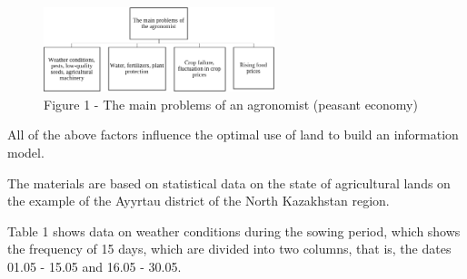 \begin{figure}[H]
	\centering
	\includegraphics[width=0.6\textwidth]{assets/1002}
	\caption*{Figure 1 - The main problems of an agronomist (peasant economy)}
\end{figure}

\begin{multicols}{2}
All of the above factors influence the optimal use of land to build an
information model.

The materials are based on statistical data on the state of agricultural
lands on the example of the Ayyrtau district of the North Kazakhstan
region.

Table 1 shows data on weather conditions during the sowing period, which
shows the frequency of 15 days, which are divided into two columns, that
is, the dates 01.05 - 15.05 and 16.05 - 30.05.
\end{multicols}

